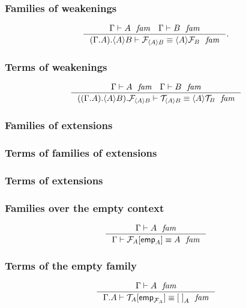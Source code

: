 \subsubsection{Families of weakenings}
\begin{equation*}
\inference
  { \jfam{\Gamma}{A}
    \jfam{\Gamma}{B}}
  { \jfameq
    {{{\Gamma}{A}}{\ctxwk{A}{B}}}
    {\mfam{\ctxwk{A}{B}}}
    {\ctxwk{A}{\mfam{B}}}}.
\end{equation*}

\subsubsection{Terms of weakenings}
\begin{equation*}
\inference
  { \jfam{\Gamma}{A}
    \jfam{\Gamma}{B}}
  { \jfameq
    {{{{\Gamma}{A}}{\ctxwk{A}{B}}}{\mfam{\ctxwk{A}{B}}}}
    {\mtm{\ctxwk{A}{B}}}
    {\ctxwk{A}{\mtm{B}}}}
\end{equation*}

\subsubsection{Families of extensions}

\subsubsection{Terms of families of extensions}

\subsubsection{Terms of extensions}

\subsubsection{Families over the empty context}
\begin{equation*}
\inference
  {\jfam{\Gamma}{A}}
  {\jfameq{\Gamma}{\subst{\tfemp{A}}{\mfam{A}}}{A}}
\end{equation*}

\subsubsection{Terms of the empty family}
\begin{equation*}
\inference
  {\jfam{\Gamma}{A}}
  {\jfameq{{\Gamma}{A}}{\subst{\tfemp{\mfam{A}}}{\mtm{A}}}{\emptyf[A]}}
\end{equation*}

